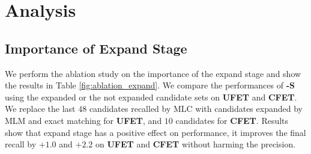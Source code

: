 \section{Analysis}
\label{sec:analyze}
\subsection{Importance of Expand Stage}
We perform the ablation study on the importance of the expand stage and show the results in Table \ref{fig:ablation_expand}. We compare the performances of {\bf \textsc{\name-S}} using the expanded or the not expanded candidate sets on {\bf \textsc{UFET}} and {\bf \textsc{CFET}}. We replace the last $48$ candidates recalled by MLC with candidates expanded by MLM and exact matching for {\bf \textsc{UFET}}, and $10$ candidates for {\bf \textsc{CFET}}. Results show that expand stage has a positive effect on performance, it improves the final recall by $+1.0$ and $+2.2$ on  {\bf \textsc{UFET}} and {\bf \textsc{CFET}} without harming the precision.

\begin{table}[t]
\centering
{}
\caption{Ablation study of expand stage.}
\label{fig:ablation_expand}
\end{table}

